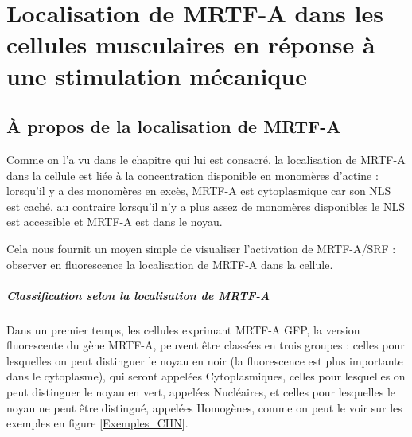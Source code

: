 %
%
%

\chapter{Localisation de MRTF-A dans les cellules musculaires en réponse à une stimulation mécanique}

\section{À propos de la localisation de MRTF-A}

 Comme on l'a vu dans le chapitre qui lui est consacré, la localisation de MRTF-A dans la cellule est liée à la concentration disponible en monomères d'actine : lorsqu'il y a des monomères en excès, MRTF-A est cytoplasmique car son NLS est caché, au contraire lorsqu'il n'y a plus assez de monomères disponibles le NLS est accessible et MRTF-A est dans le noyau. 
 
 Cela nous fournit un moyen simple de visualiser l'activation de MRTF-A/SRF : observer en fluorescence la localisation de MRTF-A dans la cellule. 
 
 \paragraph{Classification selon la localisation de MRTF-A}
 
 Dans un premier temps, les cellules exprimant MRTF-A GFP, la version fluorescente du gène MRTF-A, peuvent être classées en trois groupes : celles pour lesquelles on peut distinguer le noyau en noir (la fluorescence est plus importante dans le cytoplasme), qui seront appelées Cytoplasmiques, celles pour lesquelles on peut distinguer le noyau en vert, appelées Nucléaires, et celles pour lesquelles le noyau ne peut être distingué, appelées Homogènes, comme on peut le voir sur les exemples en figure  \ref{Exemples_CHN}.
 
